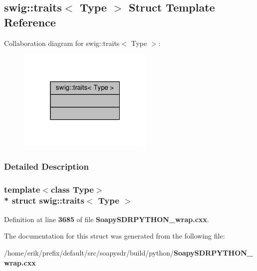 \subsection{swig\+:\+:traits$<$ Type $>$ Struct Template Reference}
\label{structswig_1_1traits}


Collaboration diagram for swig\+:\+:traits$<$ Type $>$\+:
\nopagebreak
\begin{figure}[H]
\begin{center}
\leavevmode
\includegraphics[width=184pt]{d0/d39/structswig_1_1traits__coll__graph}
\end{center}
\end{figure}


\subsubsection{Detailed Description}
\subsubsection*{template$<$class Type$>$\\*
struct swig\+::traits$<$ Type $>$}



Definition at line {\bf 3685} of file {\bf Soapy\+S\+D\+R\+P\+Y\+T\+H\+O\+N\+\_\+wrap.\+cxx}.



The documentation for this struct was generated from the following file\+:\begin{DoxyCompactItemize}
\item 
/home/erik/prefix/default/src/soapysdr/build/python/{\bf Soapy\+S\+D\+R\+P\+Y\+T\+H\+O\+N\+\_\+wrap.\+cxx}\end{DoxyCompactItemize}

